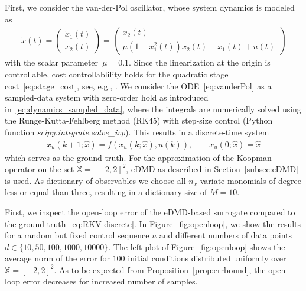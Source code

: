 \documentclass{article}
\numberwithin{equation}{section}
\newcommand{\R}{\mathbb{R}}
\begin{document}
	First, we consider the van-der-Pol oscillator, whose system dynamics is modeled as 
	\begin{align} \label{eq:vanderPol}
	\dot{x}(t) = \begin{pmatrix}
	\dot x_1(t) \\ \dot x_2(t)
	\end{pmatrix} = \begin{pmatrix}
	x_2(t) \\ \mu (1 - x_1^2(t)) x_2(t) - x_1(t) + u(t)
	\end{pmatrix}
	\end{align}
	with the scalar parameter~$\mu=0.1$. %
	Since the linearization at the origin is controllable, cost controllablility holds for the quadratic stage cost~\eqref{eq:stage_cost}, see, e.g., \cite{Wort11}.
	We consider the ODE~\eqref{eq:vanderPol} as a sampled-data system with zero-order hold as introduced in~\eqref{eq:dynamics_sampled_data}, where the integrals are numerically solved using the Runge-Kutta-Fehlberg method (RK45) with step-size control (Python function \textit{scipy.integrate.solve\_ivp}). This results in a discrete-time system
	\begin{align}\label{eq:RKV discrete}
	x_u(k+1;\hat{x}) = f(x_u(k;\hat{x}),u(k)), \qquad x_u(0;\hat{x}) = \hat{x}
	\end{align} 
	which serves as the ground truth. For the approximation of the Koopman operator on the set $\mathbb{X} = [-2, 2]^2$, eDMD as described in Section~\ref{subsec:eDMD} is used. As dictionary of observables we choose all $n_x$-variate monomials of degree less or equal than three, resulting in a dictionary size of $M = 10$.
	
	\noindent First, we inspect the open-loop error of the eDMD-based surrogate compared to the ground truth~\eqref{eq:RKV discrete}. In Figure~\ref{fig:openloop}, we show the results for a random but fixed control sequence $u$ and different numbers of data points $d \in \lbrace 10, 50, 100, 1000, 10000 \rbrace$. %
	The left plot of Figure~\ref{fig:openloop} shows the average norm of the error for $100$ initial conditions distributed uniformly over $\mathbb{X} = [-2, 2]^2$. As to be expected from Proposition~\ref{prop:errbound}, the open-loop error decreases for increased number of samples. %
	
\end{document}
